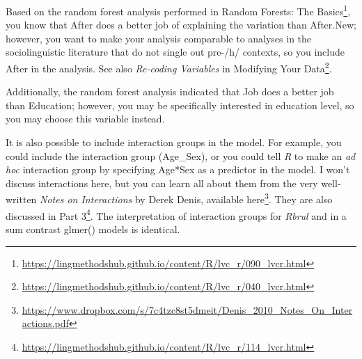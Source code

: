 \documentclass[
  10pt,
  letterpaper]{article}
\renewcommand\texttt[1]{{\ttfamily\color{BrickRed}#1}}
\DeclareRobustCommand{\href}[2]{#2\footnote{\url{#1}}}
\begin{document}
\begin{tcolorbox}[enhanced jigsaw, colbacktitle=quarto-callout-note-color!10!white, left=2mm, breakable, opacityback=0, toprule=.15mm, titlerule=0mm, bottomtitle=1mm, colframe=quarto-callout-note-color-frame, opacitybacktitle=0.6, coltitle=black, leftrule=.75mm, toptitle=1mm, rightrule=.15mm, title=\textcolor{quarto-callout-note-color}{\faInfo}\hspace{0.5em}{Note}, bottomrule=.15mm, colback=white, arc=.35mm]

Based on the random forest analysis performed in
\href{https://lingmethodshub.github.io/content/R/lvc_r/090_lvcr.html}{Random
Forests: The Basics}, you know that \texttt{After} does a better job of
explaining the variation than \texttt{After.New}; however, you want to
make your analysis comparable to analyses in the sociolinguistic
literature that do not single out pre-/h/ contexts, so you include
\texttt{After} in the analysis. See also \emph{Re-coding Variables} in
\href{https://lingmethodshub.github.io/content/R/lvc_r/040_lvcr.html}{Modifying
Your Data}.

Additionally, the random forest analysis indicated that \texttt{Job}
does a better job than Education; however, you may be specifically
interested in education level, so you may choose this variable instead.

\end{tcolorbox}

\begin{tcolorbox}[enhanced jigsaw, colbacktitle=quarto-callout-tip-color!10!white, left=2mm, breakable, opacityback=0, toprule=.15mm, titlerule=0mm, bottomtitle=1mm, colframe=quarto-callout-tip-color-frame, opacitybacktitle=0.6, coltitle=black, leftrule=.75mm, toptitle=1mm, rightrule=.15mm, title=\textcolor{quarto-callout-tip-color}{\faLightbulb}\hspace{0.5em}{Tip}, bottomrule=.15mm, colback=white, arc=.35mm]

It is also possible to include interaction groups in the model. For
example, you could include the interaction group (\texttt{Age\_Sex}), or
you could tell \emph{R} to make an \emph{ad hoc} interaction group by
specifying \texttt{Age*Sex} as a predictor in the model. I won't discuss
interactions here, but you can learn all about them from the very
well-written \emph{Notes on Interactions} by Derek Denis, available
\href{https://www.dropbox.com/s/7c4tzc8st5dmeit/Denis_2010_Notes_On_Interactions.pdf}{here}.
They are also discussed in
\href{https://lingmethodshub.github.io/content/R/lvc_r/114_lvcr.html}{Part
3}. The interpretation of interaction groups for \emph{Rbrul} and in a
sum contrast \texttt{glmer()} models is identical.

\end{tcolorbox}
\end{document}
